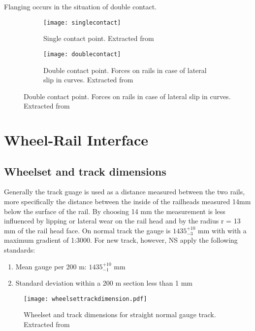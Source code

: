 Flanging occurs in the situation of double contact. 

\begin{figure}[h!]
\centering
    \begin{subfigure}[b]{0.2\textwidth}
        \centering
        \texttt{[image: singlecontact]}
        \caption{Single contact point.  Extracted from \cite[Figure 2.13]{esveld2001modern}}
        \label{fig:singlecontact}
    \end{subfigure}
    \begin{subfigure}[b]{0.5\textwidth}
        \texttt{[image: doublecontact]}
        \caption{Double contact point. Forces on rails in case of lateral slip in curves. Extracted from \cite[Figure 2.14]{esveld2001modern}}
        \label{fig:doublecontract}
    \end{subfigure}
\end{figure}

\section{Wheel-Rail Interface}

\subsection{Wheelset and track dimensions}

Generally the track guage is used as a distance measured between the two rails, more specifically the distance between the inside of the railheads measured 14mm below the surface of the rail. By choosing 14 mm the measurement is less influenced by lipping or lateral wear on the rail head and by the radius r = 13 mm of the rail head face. On normal track the gauge is $1435^{+10}_{-3}$ mm with with a maximum gradient of 1:3000. For new track, however, NS apply the following standards:

\begin{enumerate}
\item Mean gauge per 200 m: $1435^{+10}_{-1}$ mm
\item Standard deviation within a 200 m section less than 1 mm
\end{enumerate}

\begin{figure}[h]
\centering
\texttt{[image: wheelsettrackdimension.pdf]}
\caption{Wheelset and track dimensions for straight normal gauge track. Extracted from \cite[p.17]{esveld2001modern}}
\label{fig:wheelset and track dimensions}
\end{figure}

